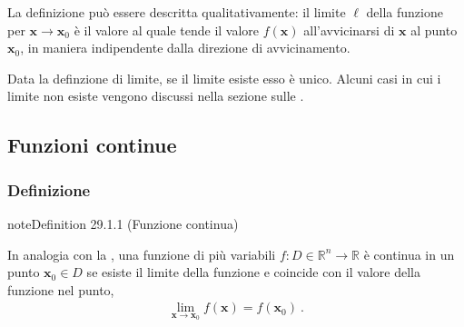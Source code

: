 \documentclass[letterpaper,10pt,italian]{jupyterBook}
\begin{document}
\sphinxAtStartPar
La definizione può essere descritta qualitativamente: il limite \(\ell\) della funzione per \(\mathbf{x} \rightarrow \mathbf{x}_0\) è il valore al quale tende il valore \(f(\mathbf{x})\) all’avvicinarsi di \(\mathbf{x}\) al punto \(\mathbf{x}_0\), in maniera indipendente dalla direzione di avvicinamento.

\sphinxAtStartPar
Data la definzione di limite, se il limite esiste esso è unico. Alcuni casi in cui i limite non esiste vengono discussi nella sezione sulle {\hyperref[\detokenize{ch/multivariable-calculus/limits:multivariable-calculus-discontinuity}]{}}.


\subsection{Funzioni continue}
\label{\detokenize{ch/multivariable-calculus/limits:funzioni-continue}}\label{\detokenize{ch/multivariable-calculus/limits:multivariable-calculus-continuity}}

\subsubsection{Definizione}
\label{\detokenize{ch/multivariable-calculus/limits:definizione}}\label{\detokenize{ch/multivariable-calculus/limits:multivariable-calculus-continuity-def}}\label{ch/multivariable-calculus/limits:multivariable-calculus-continuous-fun}
\begin{sphinxadmonition}{note}{Definition 29.1.1 (Funzione continua)}



\sphinxAtStartPar
In analogia con la {\hyperref[\detokenize{ch/infinitesimal_calculus/analysis:infinitesimal-calculus-limits-def}]{}}, una funzione di più variabili \(f: D \in \mathbb{R}^n \rightarrow \mathbb{R}\) è continua in un punto \(\mathbf{x}_0 \in D\) se esiste il limite della funzione e coincide con il valore della funzione nel punto,
\begin{equation*}
\begin{split}\lim_{\mathbf{x} \rightarrow \mathbf{x}_0} f(\mathbf{x}) = f(\mathbf{x}_0) \ .\end{split}
\end{equation*}\end{sphinxadmonition}
\end{document}

